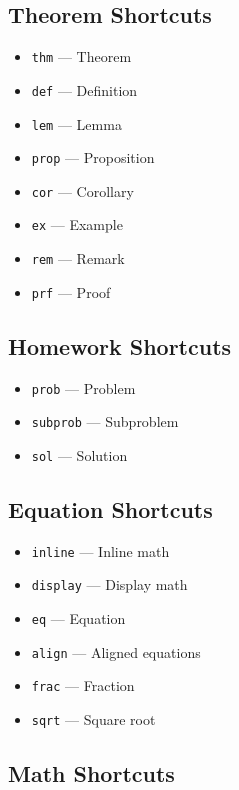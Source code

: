 \documentclass{article}
\begin{document}
\subsection{Theorem Shortcuts}

\begin{itemize}
    \item \texttt{thm} --- Theorem
    \item \texttt{def} --- Definition
    \item \texttt{lem} --- Lemma
    \item \texttt{prop} --- Proposition
    \item \texttt{cor} --- Corollary
    \item \texttt{ex} --- Example
    \item \texttt{rem} --- Remark
    \item \texttt{prf} --- Proof
\end{itemize}

\subsection{Homework Shortcuts}

\begin{itemize}
    \item \texttt{prob} --- Problem
    \item \texttt{subprob} --- Subproblem
    \item \texttt{sol} --- Solution
\end{itemize}

\subsection{Equation Shortcuts}

\begin{itemize}
    \item \texttt{inline} --- Inline math
    \item \texttt{display} --- Display math
    \item \texttt{eq} --- Equation
    \item \texttt{align} --- Aligned equations
    \item \texttt{frac} --- Fraction
    \item \texttt{sqrt} --- Square root
\end{itemize}

\subsection{Math Shortcuts}
\end{document}
